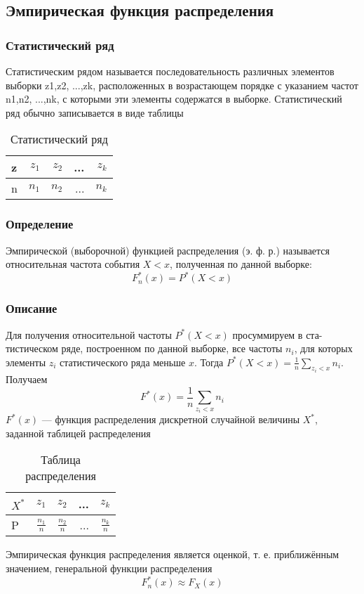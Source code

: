 \subsection{Эмпирическая функция распределения}
	\subsubsection{Статистический ряд}
	Статистическим рядом называется последовательность различных элементов выборки z1,z2, ...,zk, расположенных в возрастающем порядке с указанием частот n1,n2, ...,nk, с которыми эти элементы содержатся в выборке. Статистический ряд обычно записывается в виде таблицы
	\begin{table}[H]
		\centering
		\begin{tabular}[t]{lrrrr}
			\hline
			z   &      $z_1$ & $z_2$ & ... & $z_k$ 		\\
			\hline
			n & $n_1$ & $n_2$ & ... & $n_k$   	\\
			\hline
		\end{tabular}
		\caption{Статистический ряд}
		\label{tab:normal}
	\end{table}

	\subsubsection{Определение}
	Эмпирической (выборочной) функцией распределения (э. ф. р.) называется
	относительная частота события $X < x$, полученная по данной выборке:
	\begin{equation}
		{F_n^*(x) = P^*(X<x)}
	\end{equation}
	
	
	\subsubsection{Описание}
	Для получения относительной частоты $P^*(X < x)$ просуммируем в ста-
	тистическом ряде, построенном по данной выборке, все частоты $n_i$, для
	которых элементы $z_i$ статистического ряда меньше $x$. Тогда 
	$P^*(X<x)=\frac{1}{n}\sum\limits_{z_i<x}n_i$. Получаем
	\begin{equation}
		{F^*(x)=\frac{1}{n}\sum\limits_{z_i<x}n_i}
	\end{equation}
	$F^*(x)$ — функция распределения дискретной случайной величины $X^*$, заданной таблицей распределения
	\begin{table}[H]
		\centering
		\begin{tabular}[t]{lrrrr}
			\hline
			$X^*$   &      $z_1$ & $z_2$ & ... & $z_k$ 		\\
			\hline
			P & $\frac{n_1}{n}$ & $\frac{n_2}{n}$ & ... & $\frac{n_k}{n}$   	\\
			\hline
		\end{tabular}
		\caption{Таблица распределения}
		\label{tab:normal}
	\end{table}
	Эмпирическая функция распределения является оценкой, т. е. приближённым значением, генеральной функции распределения
	\begin{equation}
		{F_n^*(x)\approx F_X(x)}
	\end{equation}
	
